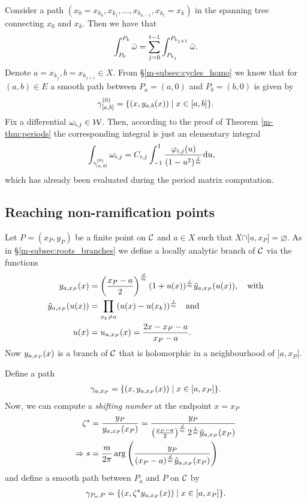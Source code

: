 \documentclass[main.tex]{subfiles}
\begin{document}
  Consider a path $(x_0=x_{k_0},x_{k_1},\dots,x_{k_{n-1}},x_{k_t}=x_k)$ in the spanning tree connecting $x_0$ and $x_k$. Then we have that
  \begin{align}
    \int_{P_0}^{P_k} \bar{\omega} = \sum_{j = 0}^{t-1}  \int_{P_{k_j}}^{P_{k_{j+1}}} \bar{\omega}.
  \end{align}
  Denote $a = x_{k_j}, b = x_{k_{j+1}} \in X$. From \S \ref{m-subsec:cycles_homo} we know that for $(a,b) \in E$ a smooth path between $P_a=(a,0)$ and $P_b=(b,0)$ is given by
  \begin{align*}
   \gamma_{[a,b]}^{(0)} = \{  (x,y_{a,b}(x))  \mid  x \in [a,b]  \}.
  \end{align*}
  Fix a differential $\omega_{i,j} \in \mathcal{W}$. Then, according to the proof of Theorem \ref{m-thm:periods} the corresponding integral is just an elementary integral
  \begin{align}
   \int_{\gamma_{[a,b]}^{(0)}} \omega_{i,j}  & =  C_{i,j}  \int_{-1}^1 \frac{\varphi_{i,j}(u)}{(1-u^2)^{\frac{j}{m}}} \mathrm d u,
  \end{align}
  which has already been evaluated during the period matrix computation.


  \subsection{Reaching non-ramification points}\label{subsec:ajm_finite}

   Let $P = (x_P,y_P)$ be a finite point on $\mathcal{C}$ and $a \in X$ such that $X\cap]a,x_P]=\varnothing$. As in \S \ref{m-subsec:roots_branches} we define a locally analytic branch of $\mathcal{C}$ via the functions
  \begin{align}\label{def:yax}
  \begin{split}
   y_{a,x_P}(x)  & =  \left(\frac{x_P-a}{2}\right)^{\frac{d}{m}}  (1 + u(x))^{\frac{j}{m}}  \tilde{y}_{a,x_P}(u(x)), \quad \text{with} \\
   \tilde{y}_{a,x_P}(u(x))  & =  \prod_{x_k \ne a} (u(x) - u(x_k))^{\frac{1}{m}} \quad \text{and} \\
   u(x) & =  u_{a,x_P}(x) = \frac{2x-x_P-a}{x_P-a}.
   \end{split}
  \end{align}
  Now $y_{a,x_P}(x)$ is a branch of $\mathcal{C}$ that is holomorphic in a neighbourhood of $]a,x_P]$.

  Define a path
  \begin{align*}
   \gamma_{a,x_P} = \{  (x,y_{a,x_P}(x))  \mid  x \in [a,x_P]  \}.
  \end{align*}
  Now, we can compute a \emph{shifting number} at the endpoint $x=x_P$
  \begin{align*}
   \zeta^s & = \frac{y_P}{y_{a,x_P}(x_P)} = \frac{y_P}{\left(\frac{x_P-a}{2}\right)^{\frac{d}{m}} 2^{\frac{1}{m}} \tilde{y}_{a,x_P}(x_P)} \\
   \Rightarrow s & = \frac{m}{2\pi} \arg\left(  \frac{y_P}{ (x_P-a)^{\frac{d}{m}} \tilde{y}_{a,x_P}(x_P)} \right)
  \end{align*}
  and define a smooth path between $P_a$ and $P$ on $\mathcal{C}$ by
  \begin{align*}
   \gamma_{P_a,P} = \{  (x, \zeta^s y_{a,x_P}(x))  \mid  x \in [a,x_P]  \}.
  \end{align*}
\end{document}
